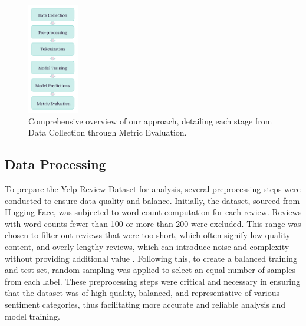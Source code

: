 \documentclass[11pt]{article}
\begin{document}
\begin{figure}[H]
  \centering
  \includegraphics[width=0.2\textwidth, height=0.3\textheight]{./methodology.jpg}
  \caption{Comprehensive overview of our approach, detailing each stage from Data Collection through Metric Evaluation.}
  \label{fig:methedology}
\end{figure}

\subsection{Data Processing}
To prepare the Yelp Review Dataset for analysis, several preprocessing steps were conducted to ensure data quality and balance. Initially, the dataset, sourced from Hugging Face, was subjected to word count computation for each review. Reviews with word counts fewer than 100 or more than 200 were excluded. This range was chosen to filter out reviews that were too short, which often signify low-quality content, and overly lengthy reviews, which can introduce noise and complexity without providing additional value \citep{pang2008sentiment}. Following this, to create a balanced training and test set, random sampling was applied to select an equal number of samples from each label. These preprocessing steps were critical and necessary in ensuring that the dataset was of high quality, balanced, and representative of various sentiment categories, thus facilitating more accurate and reliable analysis and model training.
\end{document}
